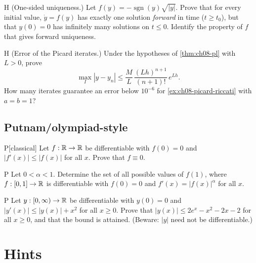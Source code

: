 \begin{problem}{H}\label{prob:ch08-h4}
(One-sided uniqueness.) Let $f(y) = -\operatorname{sgn}(y)\sqrt{|y|}$. Prove that
for every initial value, $\dot y = f(y)$ has exactly one solution \emph{forward}
in time ($t\ge t_0$), but that $y(0) = 0$ has infinitely many solutions on
$t\le 0$. Identify the property of $f$ that gives forward uniqueness.
\end{problem}

\begin{problem}{H}\label{prob:ch08-h5}
(Error of the Picard iterates.) Under the hypotheses of \cref{thm:ch08-pl} with
$L>0$, prove
\[
  \max_I|y - y_n|\le\frac{M}{L}\,\frac{(Lh)^{n+1}}{(n+1)!}\,e^{Lh}.
\]
How many iterates guarantee an error below $10^{-6}$ for
\cref{ex:ch08-picard-riccati} with $a = b = 1$?
\end{problem}

\subsection*{Putnam/olympiad-style}

\begin{problem}{P}[classical]\label{prob:ch08-p1}
Let $f:\mathbb{R}\to\mathbb{R}$ be differentiable with $f(0) = 0$ and $|f'(x)|\le|f(x)|$ for all
$x$. Prove that $f\equiv0$.
\end{problem}

\begin{problem}{P}\label{prob:ch08-p2}
Let $0<\alpha<1$. Determine the set of all possible values of $f(1)$, where
$f:[0,1]\to\mathbb{R}$ is differentiable with $f(0) = 0$ and $f'(x) = |f(x)|^\alpha$ for
all $x$.
\end{problem}

\begin{problem}{P}\label{prob:ch08-p3}
Let $y:[0,\infty)\to\mathbb{R}$ be differentiable with $y(0) = 0$ and
$|y'(x)|\le|y(x)| + x^2$ for all $x\ge0$. Prove that
$|y(x)|\le 2e^x - x^2 - 2x - 2$ for all $x\ge0$, and that the bound is
attained. (Beware: $|y|$ need not be differentiable.)
\end{problem}

\section{Hints}\label{sec:ch08-hints}

